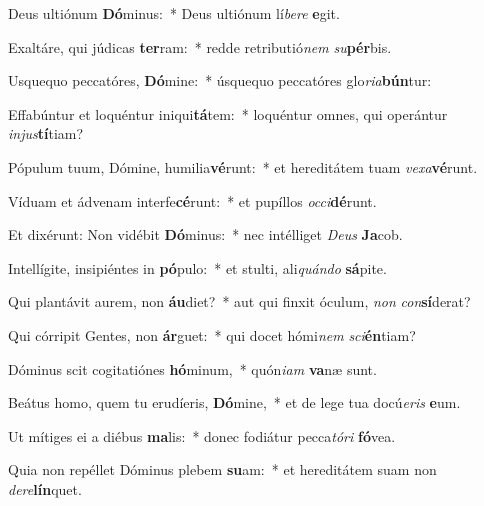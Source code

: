 \item Deus ultiónum \textbf{Dó}minus:~* Deus ultiónum lí\textit{be}\textit{re} \textbf{e}git.

\item Exaltáre, qui júdicas \textbf{ter}ram:~* redde retributió\textit{nem} \textit{su}\textbf{pér}bis.

\item Usquequo peccatóres, \textbf{Dó}mine:~* úsquequo peccatóres glo\textit{ri}\textit{a}\textbf{bún}tur:

\item Effabúntur et loquéntur iniqui\textbf{tá}tem:~* loquéntur omnes, qui operántur \textit{in}\textit{jus}\textbf{tí}tiam?

\item Pópulum tuum, Dómine, humilia\textbf{vé}runt:~* et hereditátem tuam \textit{ve}\textit{xa}\textbf{vé}runt.

\item Víduam et ádvenam interfe\textbf{cé}runt:~* et pupíllos \textit{oc}\textit{ci}\textbf{dé}runt.

\item Et dixérunt: Non vidébit \textbf{Dó}minus:~* nec intélliget \textit{De}\textit{us} \textbf{Ja}cob.

\item Intellígite, insipiéntes in \textbf{pó}pulo:~* et stulti, ali\textit{quán}\textit{do} \textbf{sá}pite.

\item Qui plantávit aurem, non \textbf{áu}diet?~* aut qui finxit óculum, \textit{non} \textit{con}\textbf{sí}derat?

\item Qui córripit Gentes, non \textbf{ár}guet:~* qui docet hómi\textit{nem} \textit{sci}\textbf{én}tiam?

\item Dóminus scit cogitatiónes \textbf{hó}minum,~* quón\textit{i}\textit{am} \textbf{va}næ sunt.

\item Beátus homo, quem tu erudíeris, \textbf{Dó}mine,~* et de lege tua docú\textit{e}\textit{ris} \textbf{e}um.

\item Ut mítiges ei a diébus \textbf{ma}lis:~* donec fodiátur pecca\textit{tó}\textit{ri} \textbf{fó}vea.

\item Quia non repéllet Dóminus plebem \textbf{su}am:~* et hereditátem suam non \textit{de}\textit{re}\textbf{lín}quet.

